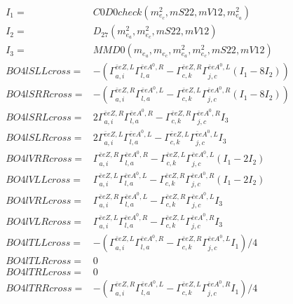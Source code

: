 \documentclass[A4,landscape]{article}
\begin{document}
\begin{align} 
I_1 = & C0D0check(m^2_{e_{{c}}}, mS22, mV12, m^2_{e_{{a}}}) \\ 
I_2 = & D_{27}(m^2_{e_{{a}}}, m^2_{e_{{c}}}, mS22, mV12) \\ 
I_3 = & MMD0(m_{e_{{a}}}, m_{e_{{c}}}, m^2_{e_{{a}}}, m^2_{e_{{c}}}, mS22, mV12) \\ 
  BO4lSLLcross= & -( \Gamma^{\bar{e}e Z ,L}_{a, i} \Gamma^{\bar{e}e A^0 ,R}_{l, a} - \Gamma^{\bar{e}e Z ,R} _{c, k} \Gamma^{\bar{e}e A^0 ,L}_{j, c} (I_1 - 8 I_2)) \\ 
  BO4lSRRcross= & -( \Gamma^{\bar{e}e Z ,R}_{a, i} \Gamma^{\bar{e}e A^0 ,L}_{l, a} - \Gamma^{\bar{e}e Z ,L} _{c, k} \Gamma^{\bar{e}e A^0 ,R}_{j, c} (I_1 - 8 I_2)) \\ 
  BO4lSRLcross= & 2  \Gamma^{\bar{e}e Z ,R}_{a, i} \Gamma^{\bar{e}e A^0 ,R}_{l, a} - \Gamma^{\bar{e}e Z ,R} _{c, k} \Gamma^{\bar{e}e A^0 ,R}_{j, c} I_3 \\ 
  BO4lSLRcross= & 2  \Gamma^{\bar{e}e Z ,L}_{a, i} \Gamma^{\bar{e}e A^0 ,L}_{l, a} - \Gamma^{\bar{e}e Z ,L} _{c, k} \Gamma^{\bar{e}e A^0 ,L}_{j, c} I_3 \\ 
  BO4lVRRcross= &  \Gamma^{\bar{e}e Z ,R}_{a, i} \Gamma^{\bar{e}e A^0 ,R}_{l, a} - \Gamma^{\bar{e}e Z ,L} _{c, k} \Gamma^{\bar{e}e A^0 ,L}_{j, c} (I_1 - 2 I_2) \\ 
  BO4lVLLcross= &  \Gamma^{\bar{e}e Z ,L}_{a, i} \Gamma^{\bar{e}e A^0 ,L}_{l, a} - \Gamma^{\bar{e}e Z ,R} _{c, k} \Gamma^{\bar{e}e A^0 ,R}_{j, c} (I_1 - 2 I_2) \\ 
  BO4lVRLcross= &  \Gamma^{\bar{e}e Z ,R}_{a, i} \Gamma^{\bar{e}e A^0 ,L}_{l, a} - \Gamma^{\bar{e}e Z ,R} _{c, k} \Gamma^{\bar{e}e A^0 ,L}_{j, c} I_3 \\ 
  BO4lVLRcross= &  \Gamma^{\bar{e}e Z ,L}_{a, i} \Gamma^{\bar{e}e A^0 ,R}_{l, a} - \Gamma^{\bar{e}e Z ,L} _{c, k} \Gamma^{\bar{e}e A^0 ,R}_{j, c} I_3 \\ 
  BO4lTLLcross= & -( \Gamma^{\bar{e}e Z ,L}_{a, i} \Gamma^{\bar{e}e A^0 ,R}_{l, a} - \Gamma^{\bar{e}e Z ,R} _{c, k} \Gamma^{\bar{e}e A^0 ,L}_{j, c} I_1)/4 \\ 
  BO4lTLRcross= & 0 \\ 
  BO4lTRLcross= & 0 \\ 
  BO4lTRRcross= & -( \Gamma^{\bar{e}e Z ,R}_{a, i} \Gamma^{\bar{e}e A^0 ,L}_{l, a} - \Gamma^{\bar{e}e Z ,L} _{c, k} \Gamma^{\bar{e}e A^0 ,R}_{j, c} I_1)/4 \\ 
\end{align} 
\end{document}
